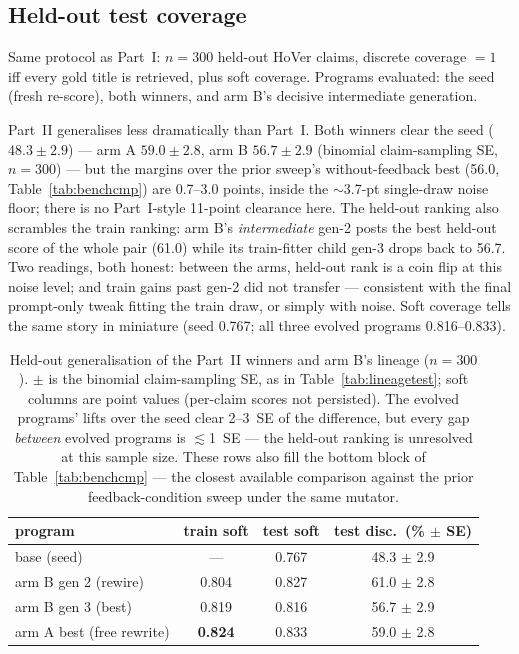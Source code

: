 \documentclass[11pt]{article}
\newcommand{\armA}{\textcolor{bad}{arm A}}
\newcommand{\armB}{\textcolor{accent}{arm B}}
\newcommand{\qTseedS}{0.767} %
\newcommand{\qTseedD}{48.3} %
\newcommand{\qTaS}{0.833}    %
\newcommand{\qTaD}{59.0}    %
\newcommand{\qTbS}{0.816}    %
\newcommand{\qTbD}{56.7}    %
\newcommand{\qTgS}{0.827}    %
\newcommand{\qTgD}{61.0}    %
\begin{document}
\subsection{Held-out test coverage}
\label{sec:benchcmpq}
Same protocol as Part~I: $n=300$ held-out HoVer claims, discrete coverage $=1$ iff every gold
title is retrieved, plus soft coverage. Programs evaluated: the seed (fresh re-score), both
winners, and \armB's decisive intermediate generation.

Part~II generalises less dramatically than Part~I. Both winners clear the seed ($48.3 \pm 2.9$)
--- \armA{} $59.0 \pm 2.8$, \armB{} $56.7 \pm 2.9$ (binomial claim-sampling SE, $n=300$) --- but
the margins over the prior sweep's without-feedback best
(56.0, Table~\ref{tab:benchcmp}) are 0.7--3.0 points, inside the $\sim$3.7-pt single-draw noise
floor; there is no Part~I-style 11-point clearance here. The held-out ranking also scrambles the
train ranking: \armB's \emph{intermediate} gen-2 posts the best held-out score of the whole pair
(61.0) while its train-fitter child gen-3 drops back to 56.7. Two readings, both honest: between
the arms, held-out rank is a coin flip at this noise level; and train gains past gen-2 did not
transfer --- consistent with the final prompt-only tweak fitting the train draw, or simply with
noise. Soft coverage tells the same story in miniature (seed 0.767; all three evolved programs
0.816--0.833).

\begin{table}[H]\centering\small
\begin{tabular}{lccc}
\toprule
program & train soft & test soft & test disc.\ (\% $\pm$ SE) \\
\midrule
base (seed)                     & ---            & \qTseedS & \qTseedD{} $\pm$ 2.9 \\
\armB{} gen 2 (rewire)          & 0.804          & \qTgS    & \qTgD{} $\pm$ 2.8 \\
\armB{} gen 3 (best)            & 0.819          & \qTbS    & \qTbD{} $\pm$ 2.9 \\
\armA{} best (free rewrite)     & \textbf{0.824} & \qTaS    & \qTaD{} $\pm$ 2.8 \\
\bottomrule
\end{tabular}
\caption{Held-out generalisation of the Part~II winners and \armB's lineage ($n=300$). $\pm$ is
the binomial claim-sampling SE, as in Table~\ref{tab:lineagetest}; soft columns are point values
(per-claim scores not persisted). The evolved programs' lifts over the seed clear 2--3~SE of the
difference, but every gap \emph{between} evolved programs is $\lesssim$1~SE --- the held-out ranking
is unresolved at this sample size. These rows also fill the bottom block of
Table~\ref{tab:benchcmp} --- the closest available comparison against the prior
feedback-condition sweep under the same mutator.}
\label{tab:lineagetestq}
\end{table}
\end{document}
